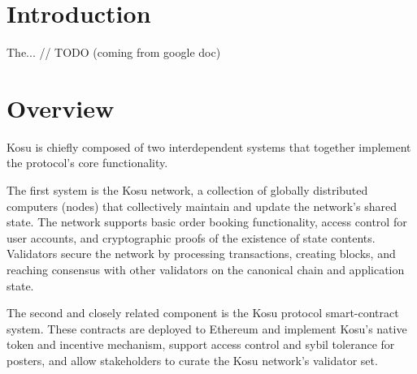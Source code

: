 \documentclass[9pt]{article}
\begin{document}

\tableofcontents
\pagebreak


\section{Introduction}\label{intro}

\noindent The... // TODO (coming from google doc)

\clearpage
\pagebreak


\section{Overview}\label{overview}

\noindent Kosu is chiefly composed of two interdependent systems that together implement the protocol’s core functionality.

\medskip

\noindent The first system is the Kosu network, a collection of globally distributed computers (nodes) that collectively maintain and update the network’s shared state. The network supports basic order booking functionality, access control for user accounts, and cryptographic proofs of the existence of state contents. Validators secure the network by processing transactions, creating blocks, and reaching consensus with other validators on the canonical chain and application state. 

\medskip

\noindent The second and closely related component is the Kosu protocol smart-contract system. These contracts are deployed to Ethereum and implement Kosu’s native token and incentive mechanism, support access control and sybil tolerance for posters, and allow stakeholders to curate the Kosu network’s validator set.
\end{document}
